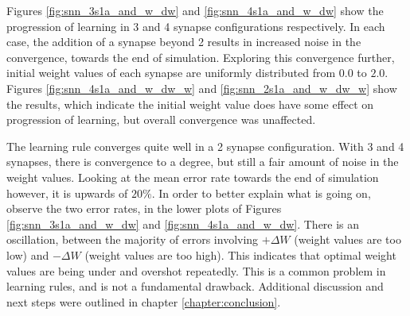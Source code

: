 

Figures \ref{fig:snn_3s1a_and_w_dw} and \ref{fig:snn_4s1a_and_w_dw} show the
progression of learning in 3 and 4 synapse configurations respectively. In each
case, the addition of a synapse beyond 2 results in increased noise in the
convergence, towards the end of simulation. Exploring this convergence further,
initial weight values of each synapse are uniformly distributed from $0.0$ to
$2.0$. Figures \ref{fig:snn_4s1a_and_w_dw_w} and \ref{fig:snn_2s1a_and_w_dw_w}
show the results, which indicate the initial weight value does have some effect
on progression of learning, but overall convergence was unaffected.



The learning rule converges quite well in a 2 synapse configuration. With 3 and
4 synapses, there is convergence to a degree, but still a fair amount of noise
in the weight values. Looking at the mean error rate towards the end of
simulation however, it is upwards of $20\%$. In order to better explain what is
going on, observe the two error rates, in the lower plots of Figures
\ref{fig:snn_3s1a_and_w_dw} and \ref{fig:snn_4s1a_and_w_dw}. There is an
oscillation, between the majority of errors involving $+\Delta W$ (weight values
are too low) and $-\Delta W$ (weight values are too high). This indicates that
optimal weight values are being under and overshot repeatedly. This is a common
problem in learning rules, and is not a fundamental drawback. Additional
discussion and next steps were outlined in chapter \ref{chapter:conclusion}.

